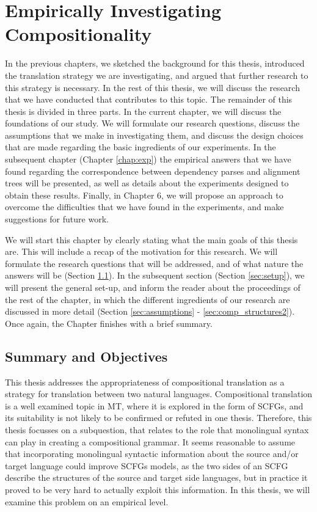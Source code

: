 %
%

\chapter{Empirically Investigating Compositionality}

In the previous chapters, we sketched the background for this thesis, introduced the translation strategy we are investigating, and argued that further research to this strategy is necessary. In the rest of this thesis, we will discuss the research that we have conducted that contributes to this topic. The remainder of this thesis is divided in three parts. In the current chapter, we will discuss the foundations of our study. We will formulate our research questions, discuss the assumptions that we make in investigating them, and discuss the design choices that are made regarding the basic ingredients of our experiments. In the subsequent chapter (Chapter \ref{chap:exp}) the empirical answers that we have found regarding the correspondence between dependency parses and alignment trees will be presented, as well as details about the experiments designed to obtain these results. Finally, in Chapter 6, we will propose an approach to overcome the difficulties that we have found in the experiments, and make suggestions for future work.

We will start this chapter by clearly stating what the main goals of this thesis are. This will include a recap of the motivation for this research. We will formulate the research questions that will be addressed, and of what nature the answers will be (Section \ref{sec:goals}). In the subsequent section (Section \ref{sec:setup}), we will present the general set-up, and inform the reader about the proceedings of the rest of the chapter, in which the different ingredients of our research are discussed in more detail (Section \ref{sec:assumptions} - \ref{sec:comp_structures2}). Once again, the Chapter finishes with a brief summary.


\section{Summary and Objectives}
\label{sec:goals}

This thesis addresses the appropriateness of compositional translation as a strategy for translation between two natural languages. Compositional translation is a well examined topic in MT, where it is explored in the form of SCFGs, and its suitability is not likely to be confirmed or refuted in one thesis. Therefore, this thesis focusses on a subquestion, that relates to the role that monolingual syntax can play in creating a compositional grammar. It seems reasonable to assume that incorporating monolingual syntactic information about the source and/or target language could improve SCFGs models, as the two sides of an SCFG describe the structures of the source and target side languages, but in practice it proved to be very hard to actually exploit this information. In this thesis, we will examine this problem on an empirical level.

